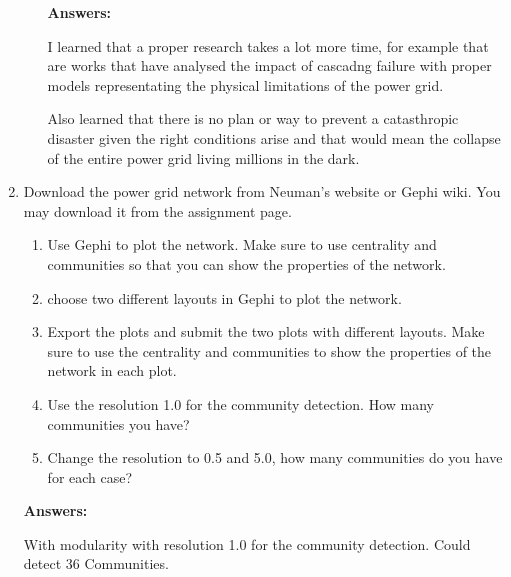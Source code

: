 \documentclass{amsart}
\theoremstyle{definition}
\theoremstyle{remark}
\numberwithin{equation}{section}
\begin{document}
\begin{enumerate}
\begin{enumerate}
\textbf{Answers:}

I learned that a proper research takes a lot more time, for example that are works that have analysed the impact of cascadng failure with proper models representating the physical limitations of the power grid. \vspace{0.2cm}

Also learned that there is no plan or way to prevent a catasthropic disaster given the right conditions arise and that would mean the collapse of the entire power grid living millions in the dark.

\vspace{0.5cm}
\end{enumerate}

\clearpage


\item Download the power grid network from Neuman's website or Gephi wiki. You may download it from the assignment page. 
\begin{enumerate}
\item Use Gephi to plot the network. Make sure to use centrality and communities so that you can show the properties of the network.
\item choose two different layouts in Gephi to plot the network. 
\item Export the plots and submit the two plots with different layouts. Make sure to use the centrality and communities to show the properties of the network in each plot.
\item Use the resolution 1.0 for the community detection. How many communities you have? 
\item Change the resolution to 0.5 and 5.0, how many communities do you  have for each case?
\end{enumerate}
\vspace{0.5cm}

\textbf{Answers:} \vspace{0.5cm}


With modularity with resolution 1.0 for the community detection. Could detect 36 Communities. \vspace{0.2cm}


\end{enumerate}
\end{document}
